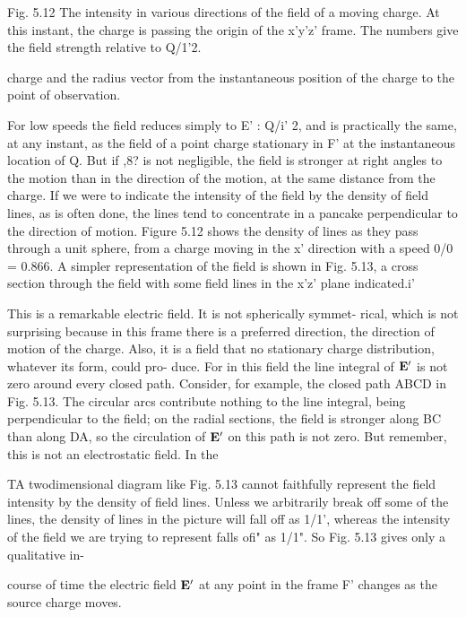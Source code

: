  

Fig. 5.12 The intensity in various directions
of the field of a moving charge. At
this instant, the charge is passing the origin
of the x'y'z' frame. The numbers give the
field strength relative to Q/1'2.

charge and the radius vector from the instantaneous position of the
charge to the point of observation.

For low speeds the field reduces simply to E' : Q/i' 2, and is practically
the same, at any instant, as the field of a point charge stationary
in F' at the instantaneous location of Q. But if ,8? is not
negligible, the field is stronger at right angles to the motion than in
the direction of the motion, at the same distance from the charge.
If we were to indicate the intensity of the field by the density of field
lines, as is often done, the lines tend to concentrate in a pancake
perpendicular to the direction of motion. Figure 5.12 shows the
density of lines as they pass through a unit sphere, from a charge
moving in the x' direction with a speed 0/0 = 0.866. A simpler representation
of the field is shown in Fig. 5.13, a cross section through
the field with some field lines in the x'z' plane indicated.i'

This is a remarkable electric field. It is not spherically symmet-
rical, which is not surprising because in this frame there is a preferred
direction, the direction of motion of the charge. Also, it is a field
that no stationary charge distribution, whatever its form, could pro-
duce. For in this field the line integral of $\mathbf{E}'$ is not zero around every
closed path. Consider, for example, the closed path ABCD in
Fig. 5.13. The circular arcs contribute nothing to the line integral,
being perpendicular to the field; on the radial sections, the field is
stronger along BC than along DA, so the circulation of $\mathbf{E}'$ on this path
is not zero. But remember, this is not an electrostatic field. In the

TA twodimensional diagram like Fig. 5.13 cannot faithfully represent the field intensity
by the density of field lines. Unless we arbitrarily break off some of the lines,
the density of lines in the picture will fall off as 1/1', whereas the intensity of the field
we are trying to represent falls ofi" as 1/1". So Fig. 5.13 gives only a qualitative in-

 

course of time the electric field $\mathbf{E}'$ at any point in the frame F' changes
as the source charge moves.

